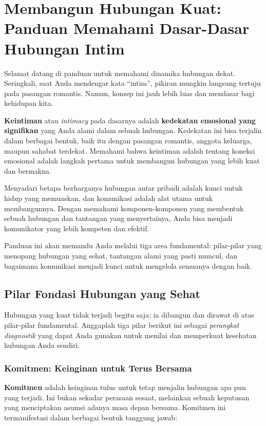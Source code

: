 \documentclass[
  letterpaper,
  DIV=11,
  numbers=noendperiod]{scrreprt}
\begin{document}
\chapter{Membangun Hubungan Kuat: Panduan Memahami Dasar-Dasar Hubungan
Intim}\label{membangun-hubungan-kuat-panduan-memahami-dasar-dasar-hubungan-intim}

Selamat datang di panduan untuk memahami dinamika hubungan dekat.
Seringkali, saat Anda mendengar kata ``intim'', pikiran mungkin langsung
tertuju pada pasangan romantis. Namun, konsep ini jauh lebih luas dan
mendasar bagi kehidupan kita.

\textbf{Keintiman} atau \emph{intimacy} pada dasarnya adalah
\textbf{kedekatan emosional yang signifikan} yang Anda alami dalam
sebuah hubungan. Kedekatan ini bisa terjalin dalam berbagai bentuk, baik
itu dengan pasangan romantis, anggota keluarga, maupun sahabat terdekat.
Memahami bahwa keintiman adalah tentang koneksi emosional adalah langkah
pertama untuk membangun hubungan yang lebih kuat dan bermakna.

Menyadari betapa berharganya hubungan antar pribadi adalah kunci untuk
hidup yang memuaskan, dan komunikasi adalah alat utama untuk
membangunnya. Dengan memahami komponen-komponen yang membentuk sebuah
hubungan dan tantangan yang menyertainya, Anda bisa menjadi komunikator
yang lebih kompeten dan efektif.

Panduan ini akan memandu Anda melalui tiga area fundamental: pilar-pilar
yang menopang hubungan yang sehat, tantangan alami yang pasti muncul,
dan bagaimana komunikasi menjadi kunci untuk mengelola semuanya dengan
baik.

\section{Pilar Fondasi Hubungan yang
Sehat}\label{pilar-fondasi-hubungan-yang-sehat}

Hubungan yang kuat tidak terjadi begitu saja; ia dibangun dan dirawat di
atas pilar-pilar fundamental. Anggaplah tiga pilar berikut ini sebagai
\emph{perangkat diagnostik} yang dapat Anda gunakan untuk menilai dan
memperkuat kesehatan hubungan Anda sendiri.

\subsection{Komitmen: Keinginan untuk Terus
Bersama}\label{komitmen-keinginan-untuk-terus-bersama}

\textbf{Komitmen} adalah keinginan tulus untuk tetap menjalin hubungan
apa pun yang terjadi. Ini bukan sekadar perasaan sesaat, melainkan
sebuah keputusan yang menciptakan asumsi adanya masa depan bersama.
Komitmen ini termanifestasi dalam berbagai bentuk tanggung jawab:
\end{document}
